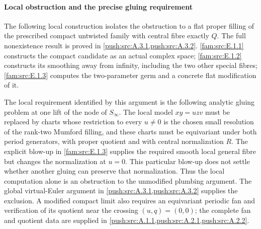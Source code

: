 \paragraph{Local obstruction and the precise gluing requirement}\label{fam:src:E.1.5}\label{fam:st:E.1.5}

The following local construction isolates the obstruction to a flat proper filling of the prescribed compact untwisted family with central fibre exactly $Q$. The full nonexistence result is proved in \cref{push:src:A.3.1,push:src:A.3.2}. \ref{fam:src:E.1.1} constructs the compact candidate as an actual complex
space; \ref{fam:src:E.1.2} constructs its smoothing away from infinity, including
the two other special fibres; \ref{fam:src:E.1.3} computes the two-parameter germ and a concrete flat modification of it.

The local requirement identified by this argument is the following analytic gluing
problem at one lift of the node of $S_\infty$. The local model
$xy=uzv$ must be replaced by charts whose restriction to every
$u\ne0$ is the chosen small resolution of the rank-two Mumford
filling, and these charts must be equivariant under both period
generators, with proper quotient and with central normalization $R$.
The explicit blow-up in \ref{fam:src:E.1.3} supplies the required smooth local
general fibre but changes the normalization at $u=0$. This particular blow-up does not settle whether another gluing can preserve that normalization. Thus the local computation alone is an obstruction to the unmodified plumbing argument. The global virtual-Euler argument in \cref{push:src:A.3.1,push:src:A.3.2} supplies the exclusion. A modified compact limit
also requires an equivariant periodic fan and verification of its
quotient near the crossing $(u,q)=(0,0)$; the complete fan and quotient data are supplied in \cref{push:src:A.1.1,push:src:A.2.1,push:src:A.2.2}.




